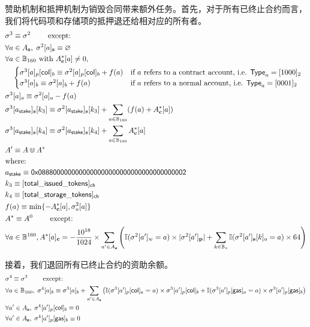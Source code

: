 赞助机制和抵押机制为销毁合同带来额外任务。首先，对于所有已终止合约而言，我们将代码项和存储项的抵押退还给相对应的所有者。
\begin{align}
& \st^3  \eqdef \st^2 \qquad \mbox{  except:}\\
& \forall a \in A_{\bf s},\; \st^2[a]_{\bf s} \eqdef \varnothing \\
&\forall a \in \B_{160} \text{ with }  A^*_{\bf c}[a]\neq 0, \\
&\quad \begin{cases}
\st^3[a]_p[{\sf col}]_b \eqdef \st^2[a]_p[{\sf col}]_b + f(a) & \mbox{if $a$ refers to a contract account, i.e. $\mathsf{Type}_{a}=\typecontract$} \\
\st^3[a]_b \eqdef \st^2[a]_b + f(a) & \mbox{if $a$ refers to a normal account, i.e. $\mathsf{Type}_{a}= \typenormal$}
\end{cases}\\
& \st^3[a]_o \eqdef \st^2[a]_o - f(a)\\ 
&\st^3[a_{\sf stake}]_{\bf s}[k_3] \eqdef \st^2[a_{\sf stake}]_{\bf s}[k_3] + \sum_{a\in \B_{160}}(f(a) + A^*_{\bf c}[a]) \\
&\st^3[a_{\sf stake}]_{\bf s}[k_4] \eqdef \st^2[a_{\sf stake}]_{\bf s}[k_4] + \sum_{a\in \B_{160}}A^*_{\bf c}[a] \\
& A' \eqdef A \Cup A^* \\ 
&\mbox{where:}  \\
&a_{\sf stake} \eqdef \stakingcontract \\ 
&k_3 \eqdef {\sf [total\char`_issued\char`_tokens]_{\sf ch}}  \\ 
&k_4 \eqdef {\sf [total\char`_storage\char`_tokens]_{\sf ch}}  \\ 
& f(a) \eqdef \min\{-A^*_{\bf c}[a], \st^2_o[a]\} \\
& A^* \eqdef A^0 \qquad \mbox{  except:}\\
& \forall a \in \B^{160}, A^*[a]_{\bf c} = - \collateralperbyte \times \sum_{a'\in A_{\bf s}}\left(\mathbb{I}(\st^2[a']_{w}=a) \times |\st^2[a']_{\bf p}| + \sum_{k\in \B_*} \mathbb{I}(\st^2[a']_{\bf s}[k]_o=a)\times 64\right) 
\end{align}

接着，我们退回所有已终止合约的资助余额。
%
\begin{align}
&\mathbf{\sigma}^4  \equiv \mathbf{\sigma}^3 \qquad \mbox{  except:}\\
&\forall a \in \mathbb{B}_{160},\;  \mathbf{\sigma}^4[a]_b\equiv \mathbf{\sigma}^3[a]_b + \sum_{a'\in A_{\bf s}} \left(\mathbb{I}(\mathbf{\sigma}^3[a']_p[{\sf col}]_a=a)\times \mathbf{\sigma}^3[a']_p[{\sf col}]_b + \mathbb{I}(\mathbf{\sigma}^3[a']_p[{\sf gas}]_a=a)\times \mathbf{\sigma}^3[a']_p[{\sf gas}]_b \right)\\
&\forall a' \in A_{\bf s},\; \mathbf{\sigma}^4[a']_p[{\sf col}]_b\equiv 0 \\
&\forall a' \in A_{\bf s},\; \mathbf{\sigma}^4[a']_p[{\sf gas}]_b\equiv 0
\end{align}

